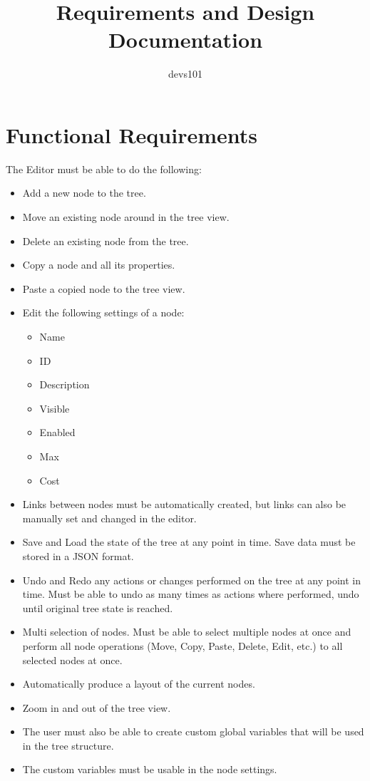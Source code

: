 \documentclass{article}
\title{Requirements and Design Documentation}
\author{devs101}
\begin{document}
\maketitle
\newpage

\section{Functional Requirements}
The Editor must be able to do the following:
\begin{itemize}
\item Add a new node to the tree.
\item Move an existing node around in the tree view.
\item Delete an existing node from the tree.
\item Copy a node and all its properties.
\item Paste a copied node to the tree view.
\item Edit the following settings of a node:
 \begin{itemize}
  \item	Name
  \item ID
  \item Description
  \item Visible
  \item Enabled
  \item Max
  \item Cost
 \end{itemize}
\item Links between nodes must be automatically created, but links can also be manually set and changed in the editor.
\item Save and Load the state of the tree at any point in time. Save data must be stored in a JSON format.
\item Undo and Redo any actions or changes performed on the tree at any point in time. Must be able to undo as many times as actions where performed, undo until original tree state is reached.
\item Multi selection of nodes. Must be able to select multiple nodes at once and perform all node operations (Move, Copy, Paste, Delete, Edit, etc.) to all selected nodes at once.
\item Automatically produce a layout of the current nodes.
\item Zoom in and out of the tree view.
\item The user must also be able to create custom global variables that will be used in the tree structure.
\item The custom variables must be usable in the node settings.
\end{itemize}
\end{document}
